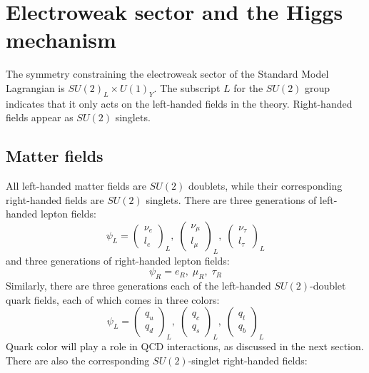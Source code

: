 \section{Electroweak sector and the Higgs mechanism}\label{sec:sm_ew}

The symmetry constraining the electroweak sector of the Standard Model Lagrangian is $SU(2)_L \times U(1)_Y$.
The subscript $L$ for the $SU(2)$ group indicates that it only acts on the left-handed fields in the theory.
Right-handed fields appear as $SU(2)$ singlets.

\subsection{Matter fields}\label{subsec:ew_fields}

All left-handed matter fields are $SU(2)$ doublets, while their corresponding right-handed fields are $SU(2)$ singlets.
There are three generations of left-handed lepton fields:
\begin{equation}\label{eq:left_handed_leptons}
    \psi_L =
    \begin{pmatrix}
        \nu_e \\ l_e
    \end{pmatrix}_L,\;
    \begin{pmatrix}
        \nu_{\mu} \\ l_{\mu}
    \end{pmatrix}_L,\;
     \begin{pmatrix}
        \nu_{\tau} \\ l_{\tau}
    \end{pmatrix}_L
\end{equation}
and three generations of right-handed lepton fields:
\begin{equation}\label{eq:right_handed_leptons}
\psi_R = e_R,\; \mu_R,\; \tau_R
\end{equation}
Similarly, there are three generations each of the left-handed $SU(2)$-doublet quark fields,
each of which comes in three colors:
\begin{equation}\label{eq:left_handed_quarks}
   \psi_L =
    \begin{pmatrix}
        q_u \\ q_d
    \end{pmatrix}_L,\;
    \begin{pmatrix}
        q_{c} \\ q_{s}
    \end{pmatrix}_L,\;
     \begin{pmatrix}
        q_{t} \\ q_{b}
    \end{pmatrix}_L
\end{equation}
Quark color will play a role in QCD interactions, as discussed in the next section.
There are also the corresponding $SU(2)$-singlet right-handed fields:

